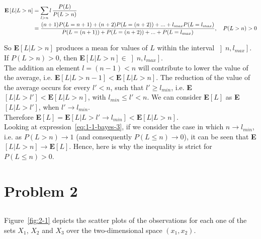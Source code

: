 \documentclass[paper=a4, fontsize=11pt]{scrartcl} %
\numberwithin{equation}{section} %
\numberwithin{figure}{section} %
\numberwithin{table}{section} %
\begin{document}
\begin{equation}
\begin{split}
    \textbf{E}\left[L|L > n\right] &= \sum\limits_{l > n} l \thinspace \frac{P(L)}{P(L > n)}\\ 
    &= \frac{(n+1)P(L = n+1) + (n+2)P(L = (n+2)) + ... + l_{max}P(L = l_{max})}{P(L = (n+1)) + P(L = (n+2)) + ... + P(L = l_{max})}, \quad P(L > n) > 0
    \label{eq:1-1-bayes-3}
\end{split}
\end{equation}

So \textbf{E}$\left[L|L > n\right]$ produces a mean for values of $L$ 
within the interval $\left]n, l_{max}\right]$. If $P(L > n) > 0$, then 
\textbf{E}$\left[L|L > n\right] \in 
\left]n, l_{max}\right]$.\\ 

The addition an element $l = (n - 1) < n$ will contribute to lower the value of 
the average, i.e. \textbf{E}$\left[L|L > n - 1\right] < \textbf{E}\left[L|L > 
n\right]$. The reduction of the value of the average occurs for every $l' < n$, 
such that $l' \geq l_{min}$, i.e. \textbf{E}$\left[L|L > l'\right] < \textbf{E}\left[L|L > 
n\right]$, with $l_{min} \le l' < n$. We can consider 
\textbf{E}$\left[L\right]$ as \textbf{E}$\left[L|L > l'\right]$, when 
$l' \to l_{min}$.\\ 

Therefore \textbf{E}$\left[L\right] =  \textbf{E}\left[L|L > l' \to l_{min} \right] < \textbf{E}\left[L|L > n\right]$.\\

Looking at expression~\ref{eq:1-1-bayes-3}, if we consider the case in which 
$n \to l_{min}$, i.e. as $P(L > n) \to 1$ (and consequently $P(L \le n) \to 0$), 
it can be seen that \textbf{E}$\left[L|L > n\right] \to \textbf{E}\left[L\right]$. 
Hence, here is why the inequality is strict for $P(L \le n) > 0$.

\section{Problem 2}

\subsection{}

Figure~\ref{fig:2-1} depicts the scatter plots of the observations for each one 
of the sets $X_1$, $X_2$ and $X_3$ over the two-dimensional space $(x_1,x_2)$.
\end{document}
